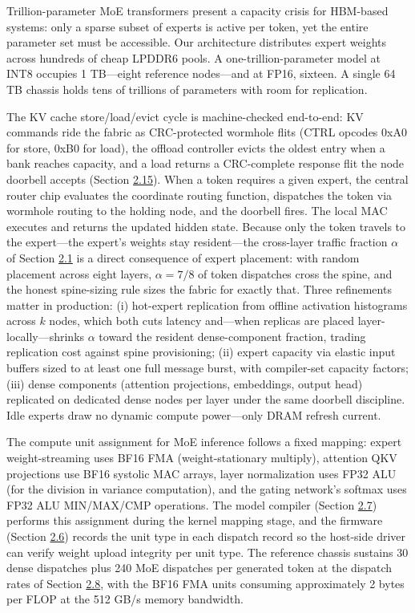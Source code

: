 \documentclass[12pt,onecolumn]{article}
\begin{document}
Trillion-parameter MoE transformers present a capacity crisis for HBM-based systems: only a sparse subset of experts is active per token, yet the entire parameter set must be accessible\cite{3,4}. Our architecture distributes expert weights across hundreds of cheap LPDDR6 pools. A one-trillion-parameter model at INT8 occupies 1 TB---eight reference nodes---and at FP16, sixteen. A single 64 TB chassis holds tens of trillions of parameters with room for replication.

The KV cache store/load/evict cycle is machine-checked end-to-end: KV commands ride the fabric as CRC-protected wormhole flits (CTRL opcodes 0xA0 for store, 0xB0 for load), the offload controller evicts the oldest entry when a bank reaches capacity, and a load returns a CRC-complete response flit the node doorbell accepts (Section \hyperref[sec:2.15]{2.15}). When a token requires a given expert, the central router chip evaluates the coordinate routing function, dispatches the token via wormhole routing to the holding node, and the doorbell fires. The local MAC executes and returns the updated hidden state. Because only the token travels to the expert---the expert's weights stay resident---the cross-layer traffic fraction $\alpha$ of Section \hyperref[sec:2.1]{2.1} is a direct consequence of expert placement: with random placement across eight layers, $\alpha = 7/8$ of token dispatches cross the spine, and the honest spine-sizing rule sizes the fabric for exactly that. Three refinements matter in production: (i) hot-expert replication from offline activation histograms across $k$ nodes, which both cuts latency and---when replicas are placed layer-locally---shrinks $\alpha$ toward the resident dense-component fraction, trading replication cost against spine provisioning; (ii) expert capacity via elastic input buffers sized to at least one full message burst, with compiler-set capacity factors; (iii) dense components (attention projections, embeddings, output head) replicated on dedicated dense nodes per layer under the same doorbell discipline. Idle experts draw no dynamic compute power---only DRAM refresh current.

The compute unit assignment for MoE inference follows a fixed mapping: expert weight-streaming uses BF16 FMA (weight-stationary multiply), attention QKV projections use BF16 systolic MAC arrays, layer normalization uses FP32 ALU (for the division in variance computation), and the gating network's softmax uses FP32 ALU MIN/MAX/CMP operations. The model compiler (Section \hyperref[sec:2.7]{2.7}) performs this assignment during the kernel mapping stage, and the firmware (Section \hyperref[sec:2.6]{2.6}) records the unit type in each dispatch record so the host-side driver can verify weight upload integrity per unit type. The reference chassis sustains 30 dense dispatches plus 240 MoE dispatches per generated token at the dispatch rates of Section \hyperref[sec:2.8]{2.8}, with the BF16 FMA units consuming approximately 2 bytes per FLOP at the 512 GB/s memory bandwidth.
\end{document}
